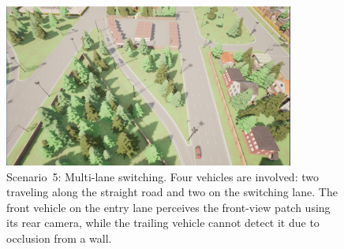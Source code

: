 \begin{figure}[H]
    \centering
    \includegraphics[width=0.85\textwidth]{figures/experiments/scenario5_v1.png}
    \caption{Scenario~5: Multi-lane switching. Four vehicles are involved: 
    two traveling along the straight road and two on the switching lane. 
    The front vehicle on the entry lane perceives the front-view patch 
    using its rear camera, while the trailing vehicle cannot detect it 
    due to occlusion from a wall.}
    \label{fig:scenario5_multilane}
\end{figure}

